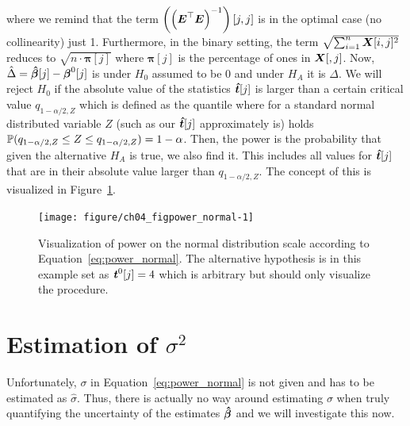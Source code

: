 \documentclass[11pt,a4paper,twoside]{book}\usepackage[]{graphicx}\usepackage[]{xcolor}
\newenvironment{knitrout}{}{} %
\begin{document}
where we remind that the term $\left(\left(\bE^\top\bE\right)^{-1}\right)[j,j]$ is in the optimal case (no collinearity) just 1.
Furthermore, in the binary setting, the term $\sqrt{\sum_{i=1}^{n}\X[i,j]^2}$ reduces to $\sqrt{n\cdot \boldsymbol{\pi}[j] }$ where $\boldsymbol{\pi}[j]$ is the percentage of ones in $\X[,j]$. Now, $\hat\Delta=\hbbeta[j]-\bbeta^0[j]$ is under $H_0$ assumed to be 0 and under $H_A$ it is $\Delta$. We will reject $H_0$ if the absolute value of the statistics $\hbt[j]$ is larger than a certain critical value $q_{1-\alpha/2,Z}$ which is defined as the quantile where for a standard normal distributed variable $Z$ (such as our $\hbt[j]$ approximately is) holds $\P(q_{1-\alpha/2,Z}\leq Z\leq q_{1-\alpha/2,Z})=1-\alpha$. Then, the power is the probability that given the alternative $H_A$ is true, we also find it.
This includes all values for $\hbt[j]$ that are in their absolute value larger than $q_{1-\alpha/2,Z}$. The concept of this is visualized in Figure~\ref{fig:power_normal}.

\begin{figure}[H]%
\begin{center}
\begin{knitrout}
\color{fgcolor}
\texttt{[image: figure/ch04\_figpower\_normal-1]} 
\end{knitrout}
\end{center}
\vspace{-1.3cm}
\caption{Visualization of power on the normal distribution scale according to Equation~\eqref{eq:power_normal}. The alternative hypothesis is in this example set as $\t^0[j]=4$ which is arbitrary but should only visualize the procedure.}
\label{fig:power_normal}
\end{figure}

\section{Estimation of $\sigma^2$}{\label{sec:sigma}}

Unfortunately, $\sigma$ in Equation~\eqref{eq:power_normal} is not given and has to be estimated as $\hat\sigma$. Thus, there is actually no way around estimating $\sigma$ when truly quantifying the uncertainty of the estimates $\hbbeta$ and we will investigate this now.
\end{document}
